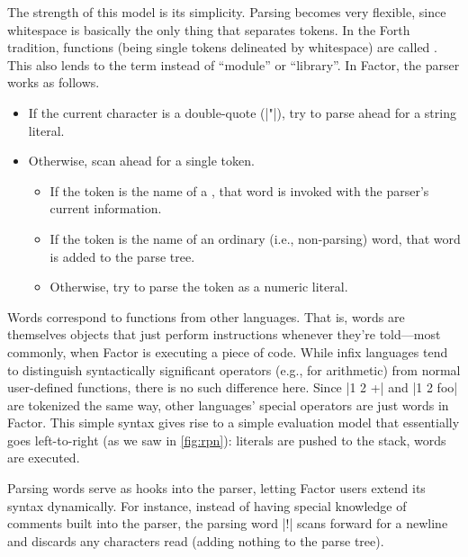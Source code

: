 The strength of this model is its simplicity.  Parsing becomes very flexible,
since whitespace is basically the only thing that separates tokens.  In the
Forth tradition, functions (being single tokens delineated by whitespace) are
called .  This also lends to the term  instead of
``module'' or ``library''.   In Factor, the parser works as follows.
\begin{itemize}
  \item If the current character is a double-quote (\inlinecode|"|), try to
        parse ahead for a string literal.
  \item Otherwise, scan ahead for a single token.
        \begin{itemize}
          \item If the token is the name of a , that word is
                invoked with the parser's current information.
          \item If the token is the name of an ordinary (i.e., non-parsing)
                word, that word is added to the parse tree.
          \item Otherwise, try to parse the token as a numeric literal.
        \end{itemize}
\end{itemize}

Words correspond to  functions from other languages.  That
is, words are themselves objects that just perform instructions whenever
they're told---most commonly, when Factor is executing a piece of code.  While
infix languages tend to distinguish syntactically significant operators (e.g.,
for arithmetic) from normal user-defined functions, there is no such difference
here.  Since \inlinecode|1 2 +| and \inlinecode|1 2 foo| are tokenized the same
way, other languages' special operators are just words in Factor.  This simple
syntax gives rise to a simple evaluation model that essentially goes
left-to-right (as we saw in \vref{fig:rpn}): literals are pushed to the stack,
words are executed.


Parsing words serve as hooks into the parser, letting Factor users extend its
syntax dynamically.  For instance, instead of having special knowledge of
comments built into the parser, the parsing word \inlinecode|!| scans forward
for a newline and discards any characters read (adding nothing to the parse
tree).

